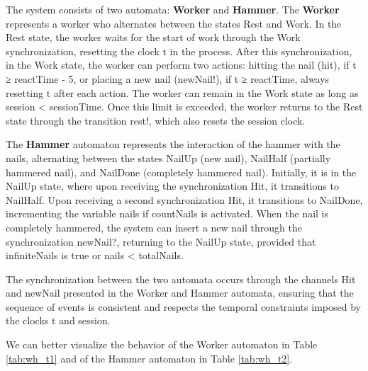 The system consists of two automata: \textbf{Worker} and \textbf{Hammer}. The \textbf{Worker} represents a worker who alternates between the states Rest and Work. In the Rest state, the worker waits for the start of work through the Work synchronization, resetting the clock t in the process. After this synchronization, in the Work state, the worker can perform two actions: hitting the nail (hit), if t ≥ reactTime - 5, or placing a new nail (newNail!), if t ≥ reactTime, always resetting t after each action. The worker can remain in the Work state as long as session < sessionTime. Once this limit is exceeded, the worker returns to the Rest state through the transition rest!, which also resets the session clock.

The \textbf{Hammer} automaton represents the interaction of the hammer with the nails, alternating between the states NailUp (new nail), NailHalf (partially hammered nail), and NailDone (completely hammered nail). Initially, it is in the NailUp state, where upon receiving the synchronization Hit, it transitions to NailHalf. Upon receiving a second synchronization Hit, it transitions to NailDone, incrementing the variable nails if countNails is activated. When the nail is completely hammered, the system can insert a new nail through the synchronization newNail?, returning to the NailUp state, provided that infiniteNails is true or nails < totalNails. 

The synchronization between the two automata occurs through the channels Hit and newNail presented in the Worker and Hammer automata, ensuring that the sequence of events is consistent and respects the temporal constraints imposed by the clocks t and session.

We can better visualize the behavior of the Worker automaton in Table \ref{tab:wh_t1} and of the Hammer automaton in Table \ref{tab:wh_t2}.
\paragraph{}


